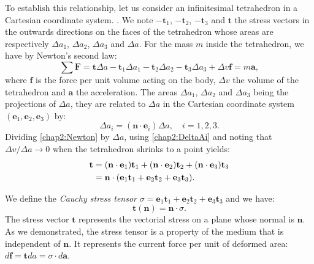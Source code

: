 To establish this relationship, let us consider an infinitesimal tetrahedron in a Cartesian coordinate system. . We note $-\mathbf{t}_1$, $-\mathbf{t}_2$, $-\mathbf{t}_3$ and $\mathbf{t}$ the stress vectors in the outwards directions on the faces of the tetrahedron whose areas are respectively $\Delta a_1$, $\Delta a_2$, $\Delta a_3$ and $\Delta a$. For the mass $m$ inside the tetrahedron, we have by Newton's second law:
\begin{equation}
\label{chap2:Newton}
\sum \mathbf{F} = \mathbf{t} \Delta a - \mathbf{t}_1 \Delta a_1 - \mathbf{t}_2 \Delta a_2 - \mathbf{t}_3 \Delta a_3 + \Delta v \mathbf{f} = m \mathbf{a},
\end{equation}
where $\mathbf{f}$ is the force per unit volume acting on the body, $\Delta v$ the volume of the tetrahedron and $\mathbf{a}$ the acceleration.
The areas $\Delta a_1$, $\Delta a_2$ and $\Delta a_3$ being the projections of $\Delta a$, they are related to $\Delta a$ in the Cartesian coordinate system $(\mathbf{e}_1, \mathbf{e}_2, \mathbf{e}_3)$ by:
\begin{equation}
\label{chap2:DeltaAi}
\Delta a_i = (\mathbf{n} \cdot \mathbf{e}_i) \Delta a, \quad i=1, 2, 3.
\end{equation}
Dividing \eqref{chap2:Newton} by $\Delta a$, using \eqref{chap2:DeltaAi} and noting that $\Delta v \slash \Delta a \rightarrow 0$ when the tetrahedron shrinks to a point yields:
\begin{align}
\mathbf{t} &= (\mathbf{n} \cdot \mathbf{e}_1) \mathbf{t}_1 + (\mathbf{n} \cdot \mathbf{e}_2) \mathbf{t}_2 + (\mathbf{n} \cdot \mathbf{e}_3) \mathbf{t}_3 \notag \\
&= \mathbf{n} \cdot (\mathbf{e}_1 \mathbf{t}_1 + \mathbf{e}_2 \mathbf{t}_2 + \mathbf{e}_3 \mathbf{t}_3).
\end{align}

We define the \emph{Cauchy stress tensor} $\sigma = \mathbf{e}_1 \mathbf{t}_1 + \mathbf{e}_2 \mathbf{t}_2 + \mathbf{e}_3 \mathbf{t}_3$ and we have:
\begin{equation}
\label{chap2:CauchyFormula}
\mathbf{t}(\mathbf{n}) = \mathbf{n} \cdot \sigma .
\end{equation}
The stress vector $\mathbf{t}$ represents the vectorial stress on a plane whose normal is $\mathbf{n}$. As we demonstrated, the stress tensor is a property of the medium that is independent of $\mathbf{n}$. It represents the current force per unit of deformed area: $d\mathbf{f} = \mathbf{t} da = \sigma \cdot d\mathbf{a}$. 

